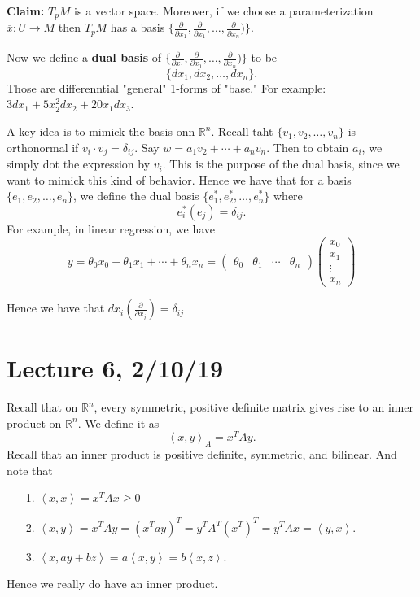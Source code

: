 \documentclass[12pt,letterpaper,boxed]{maths_v5}
\newcommand{\rr}{\mathbb{R}}
\theoremstyle{definition}
\begin{document}
    \textbf{Claim:} $T_pM$ is a vector space. Moreover, if we choose a parameterization 
    $\overline{x}: U \to M$ then $T_pM$ has a basis $\{\frac{\partial}{\partial x_1}, \frac{\partial}{\partial x_1}, \dots, \frac{\partial}{\partial x_n})\}$. 

    Now we define a \textbf{dual basis} of $\{\frac{\partial}{\partial x_1}, \frac{\partial}{\partial x_1}, \dots, \frac{\partial}{\partial x_n})\}$
    to be 
    \[
        \{ dx_1, dx_2, \dots, dx_n\}.
    \]
    Those are differenntial "general" 1-forms of "base." For example: $3dx_1 + 5x_2^2dx_2 + 20x_1dx_3$. 

    A key idea  is  to mimick the basis  onn $\rr^n$. Recall taht $\{v_1, v_2, \dots, v_n\}$ is orthonormal 
    if $v_i \cdot v_j = \delta_{ij}$. Say $w = a_1v_2 + \cdots + a_nv_n$. 
    Then to obtain $a_i$, we simply dot the expression by $v_i$. This is the purpose of 
    the dual basis, since we  want to mimick this kind of behavior. Hence we have that 
    for a basis $\{e_1, e_2, \dots, e_n\}$, we define the dual basis $\{e_1^*, e_2^*, \dots, e_n^*\}$ 
    where 
    \[
        e_i^{*}(e_j)=  \delta_{ij}.
    \]
    For example, in linear regression, we have 
    \[
        y= \theta_0x_0 + \theta_1x_1 + \cdots + \theta_nx_n = 
        \begin{pmatrix}
            \theta_0 & \theta_1 & \cdots & \theta_n
        \end{pmatrix}
        \begin{pmatrix}
            x_0\\
            x_1\\
            \vdots\\
            x_n
        \end{pmatrix}
    \]

    Hence we have that $dx_i\left( \frac{\partial}{\partial x_j} \right) = \delta_{ij}$

    \section*{Lecture  6, 2/10/19}
    Recall that on $\rr^n$, every symmetric, positive definite matrix gives rise 
    to an inner product on $\rr^n$. We define it as 
    \[
        \left< x, y \right>_A = x^{T}Ay.
    \]
    Recall that an inner product is positive definite, symmetric, and bilinear. And note that 
    \begin{itemize}
        \item[1.]  $\left< x,x \right> = x^TAx \ge 0$
        \item[2.]  $\left<x, y \right> = x^TAy= (x^Tay)^T = y^TA^T(x^T)^T = y^TAx = \left<y, x  \right>$. 
        \item[3.] $\left<x, ay +bz  \right> = a\left<x,  y\right> = b\left<x, z\right>$.
    \end{itemize}
    Hence we really do have an inner product. 
\end{document}
